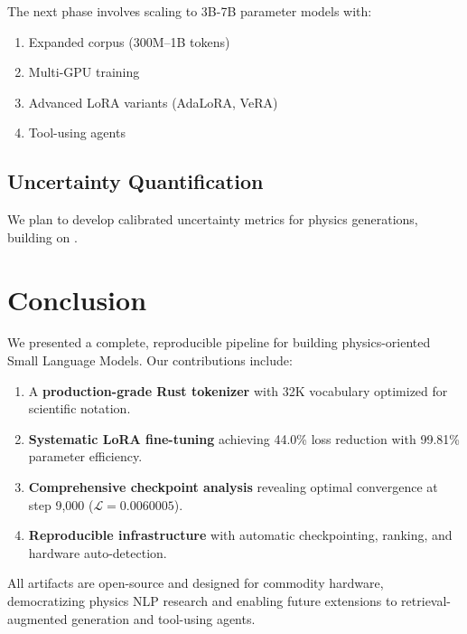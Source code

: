 \documentclass[11pt,a4paper,twocolumn]{article}
\theoremstyle{plain}
\theoremstyle{definition}
\newcommand{\loss}{\mathcal{L}}
\begin{document}
The next phase involves scaling to 3B-7B parameter models with:

\begin{enumerate}[leftmargin=*,itemsep=0pt]
    \item Expanded corpus (300M--1B tokens)
    \item Multi-GPU training
    \item Advanced LoRA variants (AdaLoRA, VeRA)
    \item Tool-using agents
\end{enumerate}

\subsection{Uncertainty Quantification}

We plan to develop calibrated uncertainty metrics for physics 
generations, building on \citet{gao2023pal}.

\section{Conclusion}

We presented a complete, reproducible pipeline for building 
physics-oriented Small Language Models. Our contributions include:

\begin{enumerate}[leftmargin=*,itemsep=0pt]
    \item A \textbf{production-grade Rust tokenizer} with 32K vocabulary 
    optimized for scientific notation.
    
    \item \textbf{Systematic LoRA fine-tuning} achieving 44.0\% loss 
    reduction with 99.81\% parameter efficiency.
    
    \item \textbf{Comprehensive checkpoint analysis} revealing optimal 
    convergence at step 9,000 ($\loss = 0.0060005$).
    
    \item \textbf{Reproducible infrastructure} with automatic 
    checkpointing, ranking, and hardware auto-detection.
\end{enumerate}

All artifacts are open-source and designed for commodity hardware, 
democratizing physics NLP research and enabling future extensions 
to retrieval-augmented generation and tool-using agents.
\end{document}
